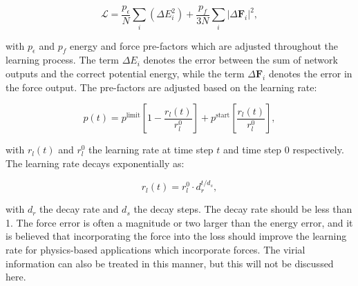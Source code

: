 \begin{equation}
    \mathcal{L} = \frac{p_{\epsilon}}{N} \sum_i
    \left( \Delta E_i^2 \right)
    + \frac{p_{f}}{3N} \sum_i \left| \Delta \bm{F}_i \right|^2,
\end{equation}

with $p_{\epsilon}$ and $p_{f}$ energy and force pre-factors which are
adjusted throughout the learning process. The term $\Delta E_i$
denotes the error between the sum of network outputs
and the correct potential energy, while the term $\Delta \bm{F}_i$
denotes the error in the force output.
The pre-factors are adjusted based on the learning rate:

\begin{equation}
    p(t) = p^{\text{limit}} \left[ 1 - \frac{r_l(t)}{r_l^0} \right]
    + p^{\text{start}} \left[ \frac{r_l(t)}{r_l^0} \right] ,
\end{equation}

with $r_l(t)$ and $r_l^0$ the learning rate at time step $t$ and time step
$0$ respectively. The learning rate decays exponentially as:

\begin{equation}
 r_l(t) = r_l^0 \cdot d_r^{t / d_s} , 
\end{equation}

with $d_r$ the decay rate and $d_s$ the decay steps. The decay
rate should be less than 1. The force error is often a magnitude or two
larger than the energy error, and it is believed that incorporating
the force into the loss should improve the learning rate for
physics-based applications which incorporate forces.
The virial information can also be treated in this manner,
but this will not be discussed here.
